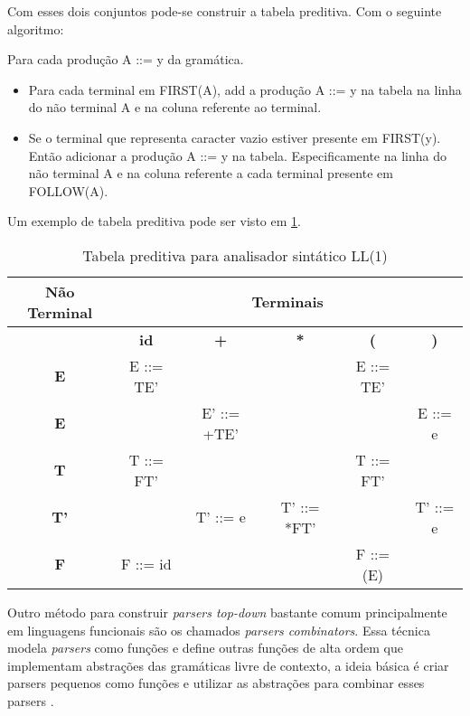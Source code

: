 Com esses dois conjuntos pode-se construir a tabela preditiva. Com o seguinte algoritmo:

Para cada produção A ::= y da gramática.

\begin{itemize}
    \item Para cada terminal em FIRST(A), add a produção A ::= y na tabela na linha do não terminal A e na coluna
    referente ao terminal.
    \item Se o terminal que representa caracter vazio estiver presente em FIRST(y). Então 
    adicionar a produção A ::= y na tabela. Especificamente na linha do não terminal A e 
    na coluna referente a cada terminal presente em FOLLOW(A).
\end{itemize}

Um exemplo de tabela preditiva pode ser visto em \ref{tbl:predictive}.

\begin{table}[h]
    \centering
	\caption{Tabela preditiva para analisador sintático LL(1)}
	\label{tbl:predictive}

    \begin{tabular}{cccccc}
        \toprule
        \multicolumn{1}{c}{\textbf{Não Terminal}} & \multicolumn{5}{c}{\textbf{Terminais}} \\
        \midrule
                       & \textbf{id} & \textbf{+} & \textbf{*} & \textbf{(} & \textbf{)}   \\
        \midrule
        \textbf{E}     & E ::= TE'  &            &             & E ::= TE'  &     \\
        \textbf{E}     &            & E' ::= +TE'&             &            & E ::= e   \\
        \textbf{T}     & T ::= FT'  &            &             & T ::= FT'  &     \\
        \textbf{T'}    &            & T' ::= e   & T' ::= *FT' &            & T' ::= e    \\
        \textbf{F}     & F ::= id   &            &             & F ::= (E)  &     \\
        \bottomrule
    \end{tabular}
\end{table}

Outro método para construir \textit{parsers top-down} bastante comum 
principalmente em linguagens funcionais são os chamados \textit{parsers combinators}.
Essa técnica modela \textit{parsers} como funções e define outras funções de alta ordem que
implementam abstrações das gramáticas livre de contexto, a ideia básica é 
criar parsers pequenos como funções e utilizar as abstrações para combinar esses parsers \cite{hutton1996monadic}.

